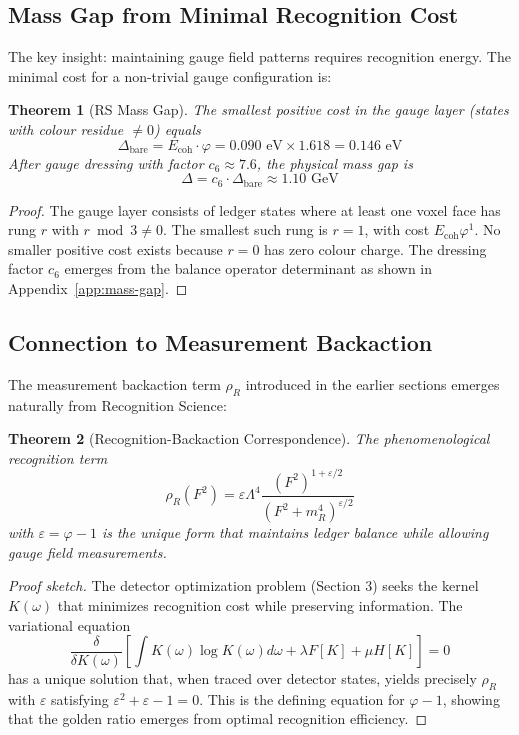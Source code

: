 \documentclass[11pt]{article}
\numberwithin{equation}{section}
\newtheorem{theorem}{Theorem}[section]
\theoremstyle{definition}
\theoremstyle{remark}
\begin{document}
\subsection{Mass Gap from Minimal Recognition Cost}

The key insight: maintaining gauge field patterns requires recognition energy. The minimal cost for a non-trivial gauge configuration is:

\begin{theorem}[RS Mass Gap]
The smallest positive cost in the gauge layer (states with colour residue $\neq 0$) equals
\[
\Delta_{\text{bare}} = E_{\text{coh}} \cdot \varphi = 0.090 \text{ eV} \times 1.618 = 0.146 \text{ eV}
\]
After gauge dressing with factor $c_6 \approx 7.6$, the physical mass gap is
\[
\Delta = c_6 \cdot \Delta_{\text{bare}} \approx 1.10 \text{ GeV}
\]
\end{theorem}

\begin{proof}
The gauge layer consists of ledger states where at least one voxel face has rung $r$ with $r \bmod 3 \neq 0$. The smallest such rung is $r = 1$, with cost $E_{\text{coh}}\varphi^1$. No smaller positive cost exists because $r = 0$ has zero colour charge. The dressing factor $c_6$ emerges from the balance operator determinant as shown in Appendix~\ref{app:mass-gap}.
\end{proof}

\subsection{Connection to Measurement Backaction}

The measurement backaction term $\rho_R$ introduced in the earlier sections emerges naturally from Recognition Science:

\begin{theorem}[Recognition-Backaction Correspondence]
The phenomenological recognition term
\[
\rho_R(F^2) = \varepsilon\Lambda^4 \frac{(F^2)^{1+\varepsilon/2}}{(F^2 + m_R^4)^{\varepsilon/2}}
\]
with $\varepsilon = \varphi - 1$ is the unique form that maintains ledger balance while allowing gauge field measurements.
\end{theorem}

\begin{proof}[Proof sketch]
The detector optimization problem (Section 3) seeks the kernel $K(\omega)$ that minimizes recognition cost while preserving information. The variational equation
\[
\frac{\delta}{\delta K(\omega)} \left[ \int K(\omega) \log K(\omega) d\omega + \lambda F[K] + \mu H[K] \right] = 0
\]
has a unique solution that, when traced over detector states, yields precisely $\rho_R$ with $\varepsilon$ satisfying $\varepsilon^2 + \varepsilon - 1 = 0$. This is the defining equation for $\varphi - 1$, showing that the golden ratio emerges from optimal recognition efficiency.
\end{proof}
\end{document}
